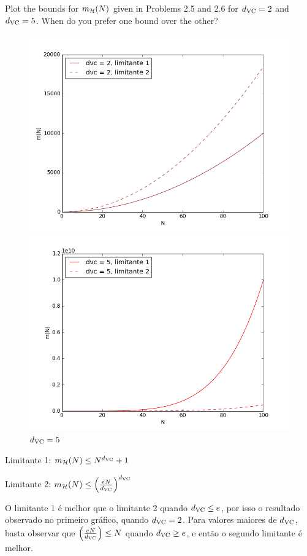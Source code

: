 \begin{enunciado}{7}
    Plot the bounds for $m_{\mathcal{H}}(N)$ given in Problems 2.5 and 2.6 for $\dvc = 2$ and $d_{\text{VC}} = 5$. When do you prefer one bound over the other?
\end{enunciado}

\begin{figure}[h]
\centering
\begin{minipage}{0.46\textwidth}
\centering
\includegraphics[width=\textwidth]{images/2-7-dvc2.png}
\caption{$\dvc = 2$}
\end{minipage}
\begin{minipage}{0.45\textwidth}
\centering
\includegraphics[width=\textwidth]{images/2-7-dvc5.png}
\caption{$d_{\text{VC}} = 5$}
\end{minipage}
\end{figure}

\begin{center}
Limitante 1: $m_{\mathcal{H}}(N) \le N^{d_{\text{VC}}} + 1$

Limitante 2: $m_{\mathcal{H}}(N) \le \left( \frac{eN}{d_{\text{VC}}} \right)^{d_{\text{VC}}}$
\end{center}


O limitante 1 é melhor que o limitante 2 quando $d_{\text{VC}} \le e$, por isso o resultado observado no primeiro gráfico, quando $\dvc = 2$. Para valores maiores de $d_{\text{VC}}$, basta observar que $\left( \frac{eN}{d_{\text{VC}}} \right) \le N$ quando $d_{\text{VC}} \ge e$, e então o segundo limitante é melhor.
